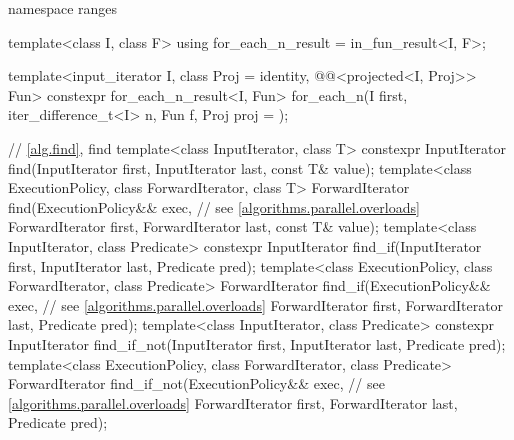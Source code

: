 \begin{codeblock}
{  namespace ranges {
    template<class I, class F>
      using for_each_n_result = in_fun_result<I, F>;

    template<input_iterator I, class Proj = identity,
             @@<projected<I, Proj>> Fun>
      constexpr for_each_n_result<I, Fun>
        for_each_n(I first, iter_difference_t<I> n, Fun f, Proj proj = {});
  }

  // \ref{alg.find}, find
  template<class InputIterator, class T>
    constexpr InputIterator find(InputIterator first, InputIterator last,
                                 const T& value);
  template<class ExecutionPolicy, class ForwardIterator, class T>
    ForwardIterator find(ExecutionPolicy&& exec,                // see \ref{algorithms.parallel.overloads}
                         ForwardIterator first, ForwardIterator last,
                         const T& value);
  template<class InputIterator, class Predicate>
    constexpr InputIterator find_if(InputIterator first, InputIterator last,
                                    Predicate pred);
  template<class ExecutionPolicy, class ForwardIterator, class Predicate>
    ForwardIterator find_if(ExecutionPolicy&& exec,             // see \ref{algorithms.parallel.overloads}
                            ForwardIterator first, ForwardIterator last,
                            Predicate pred);
  template<class InputIterator, class Predicate>
    constexpr InputIterator find_if_not(InputIterator first, InputIterator last,
                                        Predicate pred);
  template<class ExecutionPolicy, class ForwardIterator, class Predicate>
    ForwardIterator find_if_not(ExecutionPolicy&& exec,         // see \ref{algorithms.parallel.overloads}
                                ForwardIterator first, ForwardIterator last,
                                Predicate pred);

}
\end{codeblock}
